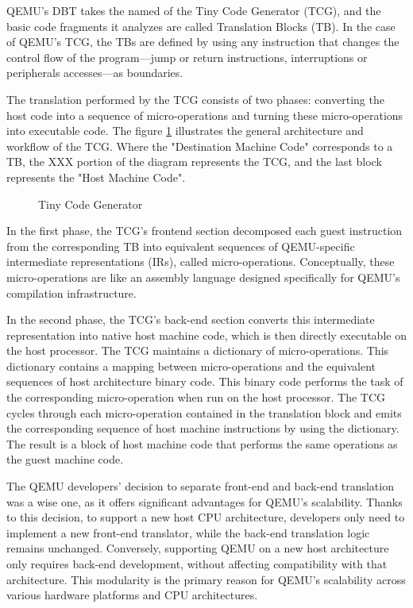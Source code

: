 
QEMU's DBT takes the named of the Tiny Code Generator (TCG), and the basic 
code fragments it analyzes are called Translation Blocks (TB). In the case of QEMU's 
TCG, the TBs are defined by using any instruction that changes the control flow of 
the program—jump or return instructions, interruptions or peripherals accesses—as 
boundaries\cite{QemuTCGOpsDevel}\cite{QemuTCGDirectBlockChaining}.

The translation performed by the TCG consists of two phases: converting the host 
code into a sequence of micro-operations and turning these micro-operations 
into executable code\cite{QemuTCGTechReport}. The figure \ref{fig:tcg} illustrates the general architecture and 
workflow of the TCG. Where the "Destination Machine Code" corresponds to a TB, the 
XXX portion of the diagram represents the TCG, and the last block represents the 
"Host Machine Code".

\begin{figure}[H]
    \centering
    \caption{Tiny Code Generator}
    \label{fig:tcg}
\end{figure}

In the first phase, the TCG's frontend section decomposed each guest instruction 
from the corresponding TB into equivalent sequences of QEMU-specific intermediate 
representations (IRs), called micro-operations. Conceptually, these micro-operations 
are like an assembly language designed specifically for QEMU's compilation infrastructure.

In the second phase, the TCG's back-end section converts this intermediate 
representation into native host machine code, which is then directly executable on 
the host processor\cite{QemuTCGFrontendOps}\cite{QemuTCGBackendOps}. The TCG maintains a dictionary of micro-operations. 
This dictionary contains a mapping between micro-operations and the equivalent 
sequences of host architecture binary code. This binary code performs the task of 
the corresponding micro-operation when run on the host processor. The TCG cycles 
through each micro-operation contained in the translation block and emits the 
corresponding sequence of host machine instructions by using the dictionary. 
The result is a block of host machine code that performs the same operations as the 
guest machine code\cite{QemuTCGTechReport}.

The QEMU developers' decision to separate front-end and back-end translation 
was a wise one, as it offers significant advantages for QEMU's scalability. Thanks 
to this decision, to support a new host CPU architecture, developers only need to 
implement a new front-end translator, while the back-end translation logic remains 
unchanged. Conversely, supporting QEMU on a new host architecture only requires 
back-end development, without affecting compatibility with that architecture. This 
modularity is the primary reason for QEMU's scalability across various hardware 
platforms and CPU architectures.

